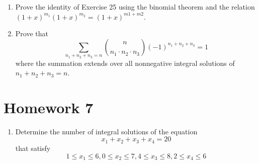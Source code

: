\documentclass{report}
\begin{document}
{\begin{enumerate}
    \item Prove the identity of Exercise 25 using the binomial theorem and the relation
          $(1+x)^{m_1}(1+x)^{m_2} = (1+x)^{m1+m2}$.

    \item Prove that $$\sum_{n_1 + n_2 + n_3 = n} \binom{n}{n_1\cdot n_2\cdot n_3}(-1)^{n_1 + n_2 + n_3} = 1$$
          where the summation extends over all nonnegative integral solutions of $n_1 + n_2 + n_3 = n$.
\end{enumerate}

\section{Homework 7}

\begin{enumerate}
    \item Determine the number of integral solutions of the equation $$x_1 + x_2 + x_3 + x_4 = 20$$ that satisfy
          $$1 \le x_1 \le 6, 0 \le x_2 \le 7, 4 \le x_3 \le 8, 2 \le x_4 \le 6$$

\end{enumerate}}
\end{document}
